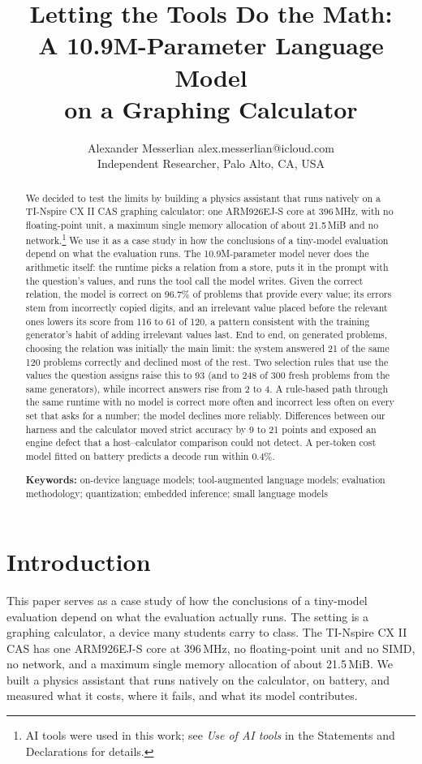 \documentclass[10pt]{article}
\title{Letting the Tools Do the Math:\\A 10.9M-Parameter Language Model\\on a Graphing Calculator}
\author{\name Alexander Messerlian \email alex.messerlian@icloud.com\\
      \addr Independent Researcher, Palo Alto, CA, USA}
\makeatletter
\newcommand{\preprintkeywords}{\if@preprint\par\medskip\noindent\textbf{Keywords:} on-device language
  models; tool-augmented language models; evaluation methodology; quantization; embedded inference;
  small language models\fi}
\makeatother
\begin{document}
\maketitle

\begin{abstract}
We decided to test the limits by building a physics assistant that runs natively on a TI-Nspire CX
II CAS graphing calculator: one ARM926EJ-S core at 396\,MHz, with no floating-point unit, a maximum
single memory allocation of about 21.5\,MiB and no network.\footnote{AI tools were used in this work;
see \emph{Use of AI tools} in the Statements and Declarations for details.} We use it as a case study in how the
conclusions of a tiny-model evaluation depend on what the evaluation runs. The 10.9M-parameter
model never does the arithmetic itself: the runtime picks a relation from a store, puts it in the
prompt with the question's values, and runs the tool call the model writes. Given the correct relation,
the model is correct on 96.7\% of problems that provide every value; its errors stem from incorrectly copied
digits, and an irrelevant value placed before the relevant ones lowers its score from 116 to 61 of 120,
a pattern consistent with the training generator's habit of adding irrelevant values last. End to
end, on generated problems, choosing the relation was initially the main limit: the system answered
21 of the same 120 problems correctly and declined most of the rest. Two selection rules that use
the values the question assigns raise this to 93 (and to 248 of 300 fresh problems from the same generators),
while incorrect answers rise from 2 to 4. A rule-based path through the same runtime with no model is
correct more often and incorrect less often on every set that asks for a number; the model declines more
reliably. Differences between our harness and the calculator moved strict accuracy by 9 to 21
points and exposed an engine defect that a host--calculator comparison could not detect. A
per-token cost model fitted on battery predicts a decode run within 0.4\%.
\preprintkeywords
\end{abstract}

\section{Introduction}
\label{sec:intro}

This paper serves as a case study of how the conclusions of a tiny-model evaluation depend on what the
evaluation actually runs. The setting is a graphing calculator, a device many students carry
to class. The TI-Nspire CX II CAS has one ARM926EJ-S core at 396\,MHz, no floating-point unit and no
SIMD, no network, and a maximum single memory allocation of about 21.5\,MiB. We built a physics assistant
that runs natively on the calculator, on battery, and measured what it costs, where it fails, and what its model
contributes.
\end{document}
